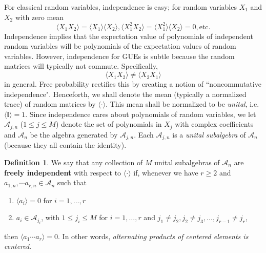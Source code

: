 \documentclass[11pt]{article}
\theoremstyle{definition}
\newtheorem{definition}{Definition}[section]
\begin{document}
For classical random variables, independence is easy; for random variables $X_1$ and $X_2$ with zero mean
\begin{equation}
\langle X_1X_2\rangle =\langle X_1\rangle\langle X_2\rangle, \langle X_1^2X_2\rangle = \langle X_1^2\rangle \langle X_2\rangle=0, \mathrm{ etc}  . 
\end{equation}
Independence implies that the expectation value of polynomials of independent random variables will be polynomials of the expectation values of random variables.  However, independence for GUEs is subtle because the random matrices will typically not commute. Specifically,
\begin{equation}
    \langle X_1X_2\rangle \neq \langle X_2X_1\rangle 
\end{equation}
in general. Free probability rectifies this by creating a notion of ``noncommutative independence". Henceforth, we shall denote the mean (typically a normalized trace) of random matrices by $\langle \cdot \rangle$. This mean shall be normalized to be \textit{unital}, i.e. $\langle \mathbb{I} \rangle =1$. Since independence cares about polynomials of random variables, we let $\mathcal{A}_{j,n}$ ($1\leq j\leq M$) denote the set of polynomials in $X_j$ with complex coefficients  and $\mathcal{A}_n$ be the algebra generated by $\mathcal{A}_{j,n}$. Each $\mathcal{A}_{j,n}$ is a \textit{unital subalgebra} of $\mathcal{A}_n$ (because they all contain the identity). 
\begin{definition}
    We say that any collection of $M$ unital subalgebras of $\mathcal{A}_{n}$ are \textbf{freely independent} with respect to $\langle \cdot \rangle$ if, whenever we have $r\geq 2$ and $a_{1,n},\cdots a_{r,n}\in \mathcal{A}_n$ such that 
    \begin{enumerate}
        \item $\langle a_i \rangle=0$ for $i=1,\ldots,r$
        \item $a_i\in \mathcal{A}_{j_i}$, with $1\leq j_i\leq M$ for $i=1,\ldots,r $ and $j_1\neq j_2, j_2\neq j_3, \ldots, j_{r-1}\neq j_r$, 
    \end{enumerate}
    then $\langle a_1\cdots a_r \rangle=0$. In other words, \textit{alternating products of centered elements is centered}.
\end{definition}
\end{document}
